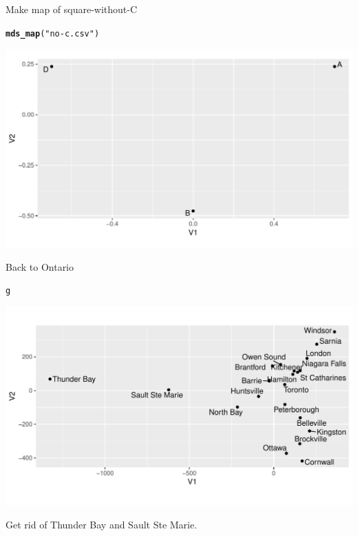 \documentclass[unknownkeysallowed]{beamer}\usepackage[]{graphicx}\usepackage[]{color}
\makeatletter
\def\maxwidth{ %
  \ifdim\Gin@nat@width>\linewidth
    \linewidth
  \else
    \Gin@nat@width
  \fi
}
\newcommand{\hlstr}[1]{\textcolor[rgb]{0.192,0.494,0.8}{#1}}%
\newcommand{\hlstd}[1]{\textcolor[rgb]{0.345,0.345,0.345}{#1}}%
\newcommand{\hlkwd}[1]{\textcolor[rgb]{0.737,0.353,0.396}{\textbf{#1}}}%
\newenvironment{kframe}{%
 \def\at@end@of@kframe{}%
 \ifinner\ifhmode%
  \def\at@end@of@kframe{\end{minipage}}%
  \begin{minipage}{\columnwidth}%
 \fi\fi%
 \def\FrameCommand##1{\hskip\@totalleftmargin \hskip-\fboxsep
 \colorbox{shadecolor}{##1}\hskip-\fboxsep
     \hskip-\linewidth \hskip-\@totalleftmargin \hskip\columnwidth}%
 \MakeFramed {\advance\hsize-\width
   \@totalleftmargin\z@ \linewidth\hsize
   \@setminipage}}%
 {\par\unskip\endMakeFramed%
 \at@end@of@kframe}
\newenvironment{knitrout}{}{} %
\makeatother
\begin{document}
\begin{frame}[fragile]{Make map of square-without-C}
  
\begin{knitrout}
\color{fgcolor}\begin{kframe}
\begin{alltt}
\hlkwd{mds_map}\hlstd{(}\hlstr{"no-c.csv"}\hlstd{)}
\end{alltt}
\end{kframe}
\includegraphics[width=\maxwidth]{figure/unnamed-chunk-405-1} 

\end{knitrout}
  
\end{frame}

\begin{frame}[fragile]{Back to Ontario}
  
\begin{knitrout}
\color{fgcolor}\begin{kframe}
\begin{alltt}
\hlstd{g}
\end{alltt}
\end{kframe}
\includegraphics[width=\maxwidth]{figure/unnamed-chunk-406-1} 

\end{knitrout}

Get rid of Thunder Bay and Sault Ste Marie.
  
\end{frame}
\end{document}
